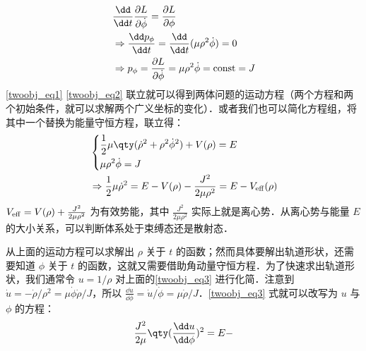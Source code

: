 \begin{equation}\label{twoobj_eq2}
\begin{aligned}
&\frac{\dd }{\dd t}\frac{\partial L}{\partial \dot\phi}=\frac{\partial L}{\partial \phi}\\&
\Rightarrow \frac{\dd p_\phi}{\dd t}=\frac{\dd }{\dd t}(\mu \rho^2\dot\phi)=0
\\&
\Rightarrow p_\phi=\frac{\partial L}{\partial \dot \phi}=\mu\rho^2\dot\phi ={\rm const}=J 
\end{aligned}
\end{equation}
\autoref{twoobj_eq1} \autoref{twoobj_eq2} 联立就可以得到两体问题的运动方程（两个方程和两个初始条件，就可以求解两个广义坐标的变化）．或者我们也可以简化方程组，将其中一个替换为能量守恒方程，联立得：
\begin{equation}\label{twoobj_eq3}
\begin{aligned}
&\left\{
\begin{aligned}
&\frac{1}{2}\mu \qty(\dot\rho^2+\rho^2\dot\phi^2)+V(\rho)=E\\
&\mu\rho^2\dot\phi=J
\end{aligned}
\right.\\
&\Rightarrow \frac{1}{2}\mu \dot\rho^2=E-V(\rho)-\frac{J^2}{2\mu\rho^2}=E-V_{\rm{eff}}(\rho)
\end{aligned}
\end{equation}
$V_{\rm{eff}}=V(\rho)+\frac{J^2}{2\mu\rho^2}$ 为有效势能，其中 $\frac{J^2}{2\mu\rho^2}$ 实际上就是离心势．从离心势与能量 $E$ 的大小关系，可以判断体系处于束缚态还是散射态．

从上面的运动方程可以求解出 $\rho$ 关于 $t$ 的函数；然而具体要解出轨道形状，还需要知道 $\phi$ 关于 $t$ 的函数，这就又需要借助角动量守恒方程．为了快速求出轨道形状，我们通常令 $u=1/\rho$ 对上面的\autoref{twoobj_eq3} 进行化简．注意到 $\dot u=-\dot \rho/\rho^2=\mu\dot \phi\dot \rho/J$，所以 $\frac{\dd u}{\dd \phi}=\dot u/\dot \phi=\mu\dot \rho/J$．\autoref{twoobj_eq3} 式就可以改写为 $u$ 与 $\phi$ 的方程：
\begin{equation}
\frac{J^2}{2\mu} \qty(\frac{\dd u}{\dd \phi})^2=E-
\end{equation}